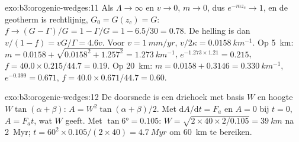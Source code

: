 \begin{solution}{exo:b3:orogenic-wedges:11}
Als $\Lambda \to \infty$ en $v \to 0$, $m \to 0$, dus $e^{-mz_c} \to 1$, en
de geotherm is rechtlijnig, $G_0 = G(z_c) = G$: $f \to (G - \Gamma)/G = 1 -
\Gamma/G = 1 - 6.5/30 = 0.78$. De helling is dan $v/(1 - f) = vG/\Gamma =
4.6v$. Voor $v = \qty{1}{mm/yr}$, $v/2\kappa = \qty{0.0158}{km^{-1}}$. Op
\qty{5}{km}: $m = 0.0158 + \sqrt{0.0158^2 + 1.257^2} = \qty{1.273}{km^{-1}}$,
$e^{-1.273\times1.21} = 0.215$, $f = 40.0\times0.215/44.7 = 0.19$. Op
\qty{20}{km}: $m = 0.0158 + 0.3146 = \qty{0.330}{km^{-1}}$, $e^{-0.399} =
0.671$, $f = 40.0\times0.671/44.7 = 0.60$.
\end{solution}

\begin{solution}{exo:b3:orogenic-wedges:12}
De doorsnede is een driehoek met basis $W$ en hoogte $W\tan(\alpha + \beta)$:
$A = W^2\tan(\alpha + \beta)/2$. Met $\mathrm dA/\mathrm dt = F_a$ en $A =
0$ bij $t = 0$, $A = F_at$, wat $W$ geeft. Met $\tan\ang{6} = 0.105$:
$W = \sqrt{2\times40\times2/0.105} = \qty{39}{km}$ na \qty{2}{Myr}; $t =
60^2\times0.105/(2\times40) = \qty{4.7}{Myr}$ om \qty{60}{km} te bereiken.
\end{solution}

